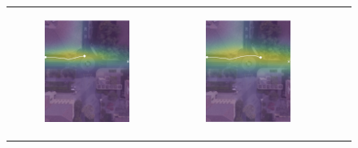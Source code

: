 \documentclass[conference]{IEEEtran}
\begin{document}
\begin{figure}
\begin{tabular}{M{.1\linewidth}  M{.3\linewidth} M{.3\linewidth}  M{.3\linewidth}}
\begin{subfigure}[b]{\linewidth}
		\includegraphics[width=\linewidth]{./figures/comparison/ours_death_1_2_t=250.png}
	\end{subfigure} &
	\begin{subfigure}[b]{\linewidth}
		\includegraphics[width=\linewidth]{./figures/comparison/ours_death_1_2_t=370.png}

\end{subfigure}
\end{tabular}
\end{figure}
\end{document}
